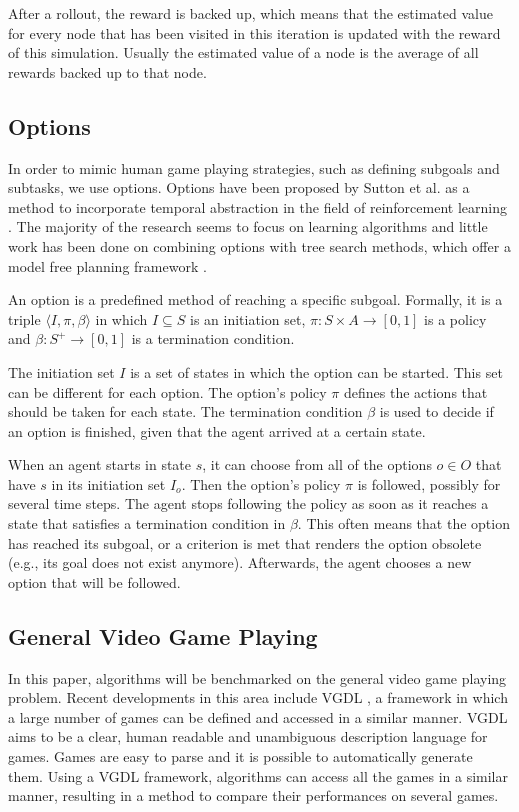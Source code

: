After a rollout, the reward is backed up, which means that the estimated value
for every node that has been visited in this iteration is updated with the
reward of this simulation. Usually the estimated value of a node is the average
of all rewards backed up to that node.

\subsection{Options}
\label{subsec:options}

In order to mimic human game playing strategies, such as defining subgoals and
subtasks, we use options. Options have been proposed by Sutton et al.  as a
method to incorporate temporal abstraction in the field of reinforcement
learning \cite{sutton1999between}. The majority of the research seems to focus
on learning algorithms and little work has been done on combining options with
tree search methods, which offer a model free planning framework
\cite{barto2003recent}.  

An option is a predefined method of reaching a specific
subgoal. Formally, it is a triple $\langle I, \pi, \beta\rangle$ in which $I
\subseteq S$ is an initiation set, $\pi: S \times A \rightarrow [0, 1]$ is a
policy and $\beta: S^+ \rightarrow[0,1]$ is a termination condition.

The initiation set $I$ is a set of states in which the
option can be started. This set can be different for each option. The option's
policy $\pi$ defines the actions that should be taken for each state. The
termination condition $\beta$ is used to decide if an option is finished, given
that the agent arrived at a certain state.

When an agent starts in state $s$, it can choose from all of the options $o \in
O$ that have $s$ in its initiation set $I_o$. Then the option's policy $\pi$ is
followed, possibly for several time steps. The agent stops following the policy
as soon as it reaches a state that satisfies a termination condition in $\beta$.
This often means that the option has reached its subgoal, or a criterion is met
that renders the option obsolete (e.g., its goal does not exist anymore).
Afterwards, the agent chooses a new option that will be followed.

\subsection{General Video Game Playing}
\label{subsec:vgdl}
In this paper, algorithms will be benchmarked on the general video game playing
problem. Recent developments in this area include VGDL \cite{schaul2013video}, a
framework in which a large number of games can be defined and accessed in a
similar manner.  VGDL aims to be a clear, human readable and unambiguous
description language for games. Games are easy to parse and it is possible to
automatically generate them. Using a VGDL framework, algorithms can access all
the games in a similar manner, resulting in a method to compare their
performances on several games.

